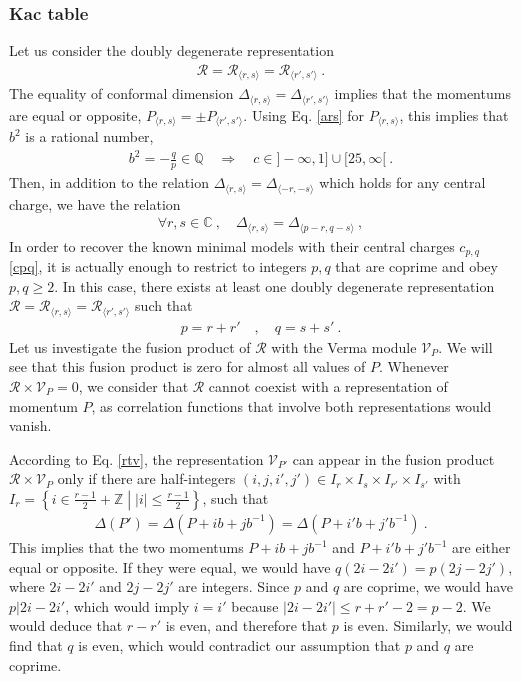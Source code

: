 \documentclass[12pt, a4paper, notitlepage, twoside]{report}
\numberwithin{equation}{section}
\theoremstyle{break}
\begin{document}
\subsubsection{Kac table}

Let us consider the doubly degenerate representation 
\begin{align}
 \mathcal{R}=\mathcal{R}_{\langle r,s \rangle}=\mathcal{R}_{\langle r',s' \rangle}\ .
 \label{rerer}
\end{align}
The equality of conformal dimension $\Delta_{\langle r,s \rangle}=\Delta_{\langle r',s' \rangle}$ implies that 
the momentums are equal or opposite, 
$P_{\langle r,s \rangle}=\pm P_{\langle r',s' \rangle}$. Using Eq. \eqref{ars} for $P_{\langle r,s\rangle}$, this implies that $b^2$ is a rational number, 
\begin{align} 
b^2=-\frac{q}{p} \in \mathbb{Q} \quad \Rightarrow \quad c\in ]-\infty, 1] \cup [25,\infty[\ .
\end{align}
Then, in addition to the relation $\Delta_{\langle r,s \rangle}=\Delta_{\langle -r,-s \rangle}$ which holds for any central charge, we have the relation
\begin{align}
 \forall r,s\in \mathbb{C}\ , \quad \Delta_{\langle r,s \rangle}=\Delta_{\langle p-r,q-s \rangle}\ ,
 \label{ddr}
\end{align}
In order to recover the known minimal models with their central charges $c_{p,q}$ \eqref{cpq}, it is actually enough to restrict to integers $p,q$ that are coprime and obey $p,q\geq 2$.
In this case, there exists at least one doubly degenerate representation $\mathcal{R}=\mathcal{R}_{\langle r,s \rangle}=\mathcal{R}_{\langle r',s' \rangle}$ such that 
\begin{align}
 p = r+r' \quad , \quad q = s+s'\ .
 \label{prrp}
\end{align}
Let us investigate the fusion product of $\mathcal{R}$ with  the Verma module $\mathcal{V}_P$. 
We will see that this fusion product is zero for almost all values of $P$. Whenever $\mathcal{R}\times \mathcal{V}_P=0$, we consider that $\mathcal{R}$ cannot coexist with a representation of momentum $P$, as correlation functions that involve both representations would vanish. 

According to Eq. \eqref{rtv}, the representation $\mathcal{V}_{P'} $ can appear in the fusion product $\mathcal{R}\times \mathcal{V}_P$ only if there are half-integers $(i,j,i',j')\in I_r\times I_s\times I_{r'}\times I_{s'}$ with $I_r=\left\{i\in \frac{r-1}{2}+\mathbb{Z}\middle| |i|\leq \frac{r-1}{2}\right\}$, such that  
\begin{align}
 \Delta(P') = \Delta\left(P+ ib+jb^{-1}\right) = \Delta\left(P+i'b+j'b^{-1}\right) \ .
 \label{dppdp}
\end{align}
This implies that the two momentums $P+ib+jb^{-1}$ and $ P+i'b+j'b^{-1}$ are either equal or opposite. If they were equal, we would have $q(2i-2i')=p(2j-2j')$, where $2i-2i'$ and $2j-2j'$ are integers. Since $p$ and $q$ are coprime, we would have $p|2i-2i'$, which would imply $i=i'$ because $|2i-2i'|\leq r+r'-2=p-2$. We would deduce that $r-r'$ is even, and therefore that $p$ is even. Similarly, we would find that $q$ is even, which would contradict our assumption that $p$ and $q$ are coprime.
\end{document}
